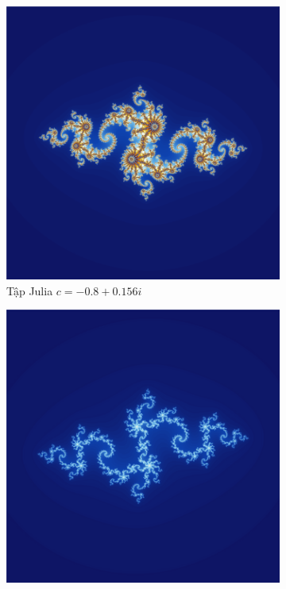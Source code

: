 \documentclass[oneside,final]{report}
\begin{document}
\begin{figure}[H]
\begin{subfigure}[b]{0.3\textwidth}
    \end{subfigure}
    \begin{subfigure}[b]{0.3\textwidth}
        \centering
        \includegraphics[width=\textwidth]{assets/images/julia_-0.8_0.156.png}
        \caption{Tập Julia $c=-0.8+0.156i$}
        \label{fig:julia_set_3}
    \end{subfigure}
    \begin{subfigure}[b]{0.3\textwidth}
        \centering
        \includegraphics[width=\textwidth]{assets/images/julia_-0.835_-0.2321.png} 

\end{subfigure}
\end{figure}
\end{document}
